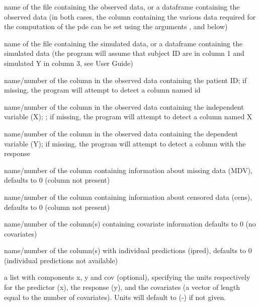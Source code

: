 \documentclass[a4paper]{book}
\begin{document}
\begin{Arguments}
\begin{ldescription}
\item[\code{namobs}] name of the file containing the observed data, or a dataframe
containing the observed data (in both cases, the column containing the
various data required for the computation of the pde can be set using the
arguments , and  below)

\item[\code{namsim}] name of the file containing the simulated data, or a dataframe
containing the simulated data (the program will assume that subject ID are
in column 1 and simulated Y in column 3, see User Guide)

\item[\code{iid}] name/number of the column in the observed data containing the patient
ID; if missing, the program will attempt to detect a column named id

\item[\code{ix}] name/number of the column in the observed data containing the
independent variable (X); ; if missing, the program will attempt to detect a column named X

\item[\code{iy}] name/number of the column in the observed data containing the dependent
variable (Y); if missing, the program will attempt to detect a column with the response

\item[\code{imdv}] name/number of the column containing information about missing data
(MDV), defaults to 0 (column not present)

\item[\code{icens}] name/number of the column containing information about censored data
(cens), defaults to 0 (column not present)

\item[\code{icov}] name/number of the column(s) containing covariate information
defaults to 0 (no covariates)

\item[\code{iipred}] name/number of the column(s) with individual predictions
(ipred), defaults to 0 (individual predictions not available)

\item[\code{units}] a list with components x, y and cov (optional), specifying the
units respectively for the predictor (x), the response (y), and the covariates 
(a vector of length equal to the number of covariates). Units will default to (-) if not given.


\end{ldescription}
\end{Arguments}
\end{document}
